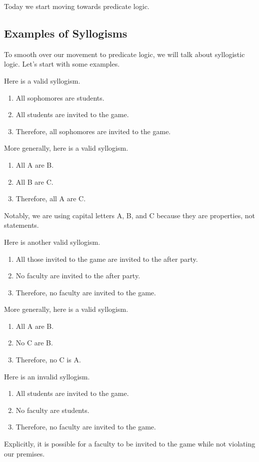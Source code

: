 \documentclass[../notes.tex]{subfiles}
\begin{document}

Today we start moving towards predicate logic.

\subsection{Examples of Syllogisms}
To smooth over our movement to predicate logic, we will talk about syllogistic logic. Let's start with some examples.
\begin{example}
	Here is a valid syllogism.
	\begin{enumerate}
		\item All sophomores are students.
		\item All students are invited to the game.
		\item Therefore, all sophomores are invited to the game.
	\end{enumerate}
\end{example}
\begin{example}
	More generally, here is a valid syllogism.
	\begin{enumerate}
		\item All A are B.
		\item All B are C.
		\item Therefore, all A are C.
	\end{enumerate}
\end{example}
\begin{remark}
	Notably, we are using capital letters A, B, and C because they are properties, not statements.
\end{remark}
\begin{example}
	Here is another valid syllogism.
	\begin{enumerate}
		\item All those invited to the game are invited to the after party.
		\item No faculty are invited to the after party.
		\item Therefore, no faculty are invited to the game.
	\end{enumerate}
\end{example}
\begin{example}
	More generally, here is a valid syllogism.
	\begin{enumerate}
		\item All A are B.
		\item No C are B.
		\item Therefore, no C is A.
	\end{enumerate}
\end{example}
\begin{nex}
	Here is an invalid syllogism.
	\begin{enumerate}
		\item All students are invited to the game.
		\item No faculty are students.
		\item Therefore, no faculty are invited to the game.
	\end{enumerate}
	Explicitly, it is possible for a faculty to be invited to the game while not violating our premises.
\end{nex}
\end{document}
